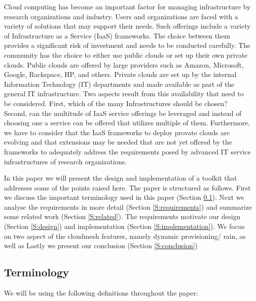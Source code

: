 \documentclass{tex/sig-alternate-2013}
\newcommand{\todo}[1]{{\color{red}{#1}}}
\begin{document}
Cloud computing has become an important factor for managing infrastructure by research organizations and industry. Users and organizations are faced with a variety of solutions that may support their needs. Such offerings include a variety of Infrastructure as a Service (IaaS) frameworks. The choice between them provides a significant risk of investment and needs to be conducted carefully. The community has the choice to either use public clouds or set up their own private clouds. Public clouds are offered by large providers such as Amazon, Microsoft, Google, Rackspace, HP, and others. Private clouds are set up by the internal Information Technology (IT) departments and made available as part of the general IT infrastructure. Two aspects result from this availability that need to be considered. First, which of the many Infrastructures should be chosen? Second, can the multitude of IaaS service offerings be leveraged and instead of choosing one a service can be offered that utilizes multiple of them. Furthermore, we have to consider that the IaaS frameworks to deploy provate clouds are evolving and that extensions may be needed that are not yet offered by the frameworks to adequately address the requirements posed by advanced IT service infrastructures of research organizations.

In this paper we will present the design and implementation of a toolkit that addresses some of the points raised here.  The paper is structured as follows. First we discuss the important terminology used in this paper (Section \ref{S:terminology}).  Next we analyse the requirements in more detail (Section \ref{S:requirements}) and summarize some related work (Section \ref{S:related}).  The requirements motivate our design (Section \ref{S:design}) and implementation (Section \ref{S:implementation}).  We focus on two aspect of the cloudmesh features, namely dynamic provisioning/ rain, as well as Lastly we present our conclusion (Section \ref{S:conclusion})

\subsection{Terminology} \label{S:terminology}

\todo{READ}
We will be using the following definitions throughout the paper:
\end{document}
